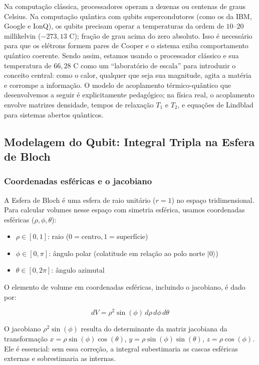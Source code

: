 Na computação clássica, processadores operam a dezenas ou centenas de graus Celsius. Na computação quântica com qubits supercondutores (como os da IBM, Google e IonQ), os qubits precisam operar a temperaturas da ordem de $10\text{--}20$ millikelvin ($-273,13$ \textdegree C); fração de grau acima do zero absoluto. Isso é necessário para que os elétrons formem pares de Cooper e o sistema exiba comportamento quântico coerente.
Sendo assim, estamos usando o processador clássico e sua temperatura de $66,28$ \textdegree C como um ``laboratório de escala'' para introduzir o conceito central: como o calor, qualquer que seja sua magnitude, agita a matéria e corrompe a informação. 
O modelo de acoplamento térmico-quântico que desenvolvemos a seguir é explicitamente pedagógico; na física real, o acoplamento envolve matrizes densidade, tempos de relaxação $T_1$ e $T_2$, e equações de Lindblad para sistemas abertos quânticos.

\subsection{Modelagem do Qubit: Integral Tripla na Esfera de Bloch}

\subsubsection{Coordenadas esféricas e o jacobiano}
A Esfera de Bloch é uma esfera de raio unitário ($r = 1$) no espaço tridimensional. Para calcular volumes nesse espaço com simetria esférica, usamos coordenadas esféricas ($\rho, \phi, \theta$):

\begin{itemize}
    \item $\rho \in [0, 1]$: raio ($0 = \text{centro}, 1 = \text{superfície}$)
    \item $\phi \in [0, \pi]$: ângulo polar (colatitude em relação ao polo norte $|0\rangle$)
    \item $\theta \in [0, 2\pi]$: ângulo azimutal
\end{itemize}

O elemento de volume em coordenadas esféricas, incluindo o jacobiano, é dado por:
\begin{caixamath}
    \begin{equation}
        dV = \rho^2 \sin(\phi) \, d\rho \, d\phi \, d\theta
    \end{equation}
\end{caixamath}

O jacobiano $\rho^2 \sin(\phi)$ resulta do determinante da matriz jacobiana da transformação $x = \rho \sin(\phi) \cos(\theta)$, $y = \rho \sin(\phi) \sin(\theta)$, $z = \rho \cos(\phi)$. Ele é essencial: sem essa correção, a integral subestimaria as cascas esféricas externas e sobrestimaria as internas.

